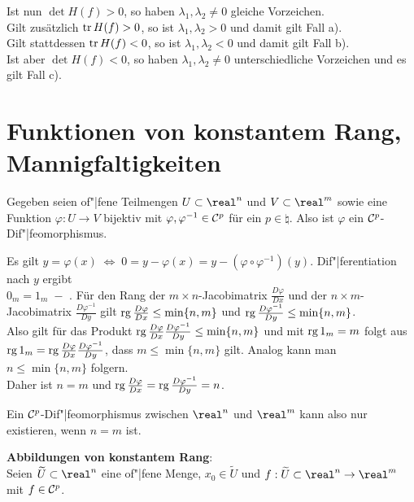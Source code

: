 Ist nun $\det H(f) > 0$, so haben $\lambda_1, \lambda_2 \not= 0$
gleiche Vorzeichen. \\
Gilt zusätzlich $\operatorname{tr} H(f) > 0$, so ist $\lambda_1, \lambda_2 > 0$ und damit
gilt Fall a). \\
Gilt stattdessen $\operatorname{tr} H(f) < 0$, so ist $\lambda_1, \lambda_2 < 0$ und damit
gilt Fall b). \\
Ist aber $\det H(f) < 0$, so haben $\lambda_1, \lambda_2 \not= 0$
unterschiedliche Vorzeichen und es gilt Fall c).

\section{%
    Funktionen von konstantem Rang, Mannigfaltigkeiten%
}

Gegeben seien of"|fene Teilmengen $U \subset \real^n$ und $V \subset \real^m$
sowie eine Funktion $\varphi: U \rightarrow V$ bijektiv mit
$\varphi, \varphi^{-1} \in \mathcal{C}^p$ für ein $p \in \natural$.
Also ist $\varphi$ ein $\mathcal{C}^p$-Dif"|feomorphismus.

Es gilt $y = \varphi(x) \;\Leftrightarrow\; 0 = y - \varphi(x)
= y - (\varphi \circ \varphi^{-1})(y)$.
Dif"|ferentiation nach $y$ ergibt \\
$0_m = 1_m \;-$ .
Für den Rang der $m \times n$-Jacobimatrix $\frac{D \varphi}{Dx}$ und
der $n \times m$-Jacobimatrix $\frac{D \varphi^{-1}}{Dy}$ gilt
$\operatorname{rg} \frac{D \varphi}{Dx} \le \min\{n, m\}$ und
$\operatorname{rg} \frac{D \varphi^{-1}}{Dy} \le \min\{n, m\}$. \\
Also gilt für das Produkt
$\operatorname{rg} \frac{D \varphi}{Dx} \frac{D \varphi^{-1}}{Dy} \le \min\{n, m\}$
und mit $\operatorname{rg} 1_m = m$ folgt aus \\
$\operatorname{rg} 1_m = \operatorname{rg} \frac{D \varphi}{Dx} \frac{D \varphi^{-1}}{Dy}$, dass
$m \le \min\{n, m\}$ gilt.
Analog kann man $n \le \min\{n, m\}$ folgern. \\
Daher ist $n = m$ und
$\operatorname{rg} \frac{D \varphi}{Dx} = \operatorname{rg} \frac{D \varphi^{-1}}{Dy} = n$.

Ein $\mathcal{C}^p$-Dif"|feomorphismus zwischen $\real^n$ und $\real^m$ kann also
nur existieren, wenn $n = m$ ist.

\linie

\textbf{Abbildungen von konstantem Rang}: \\
Seien $\widetilde{U} \subset \real^n$ eine of"|fene Menge,
$x_0 \in \widetilde{U}$ und
$f: \widetilde{U} \subset \real^n \rightarrow \real^m$ mit $f \in \mathcal{C}^p$.

